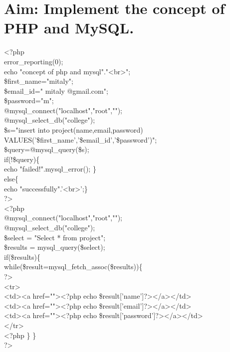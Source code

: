 \section*{\fontsize{16}{14}\selectfont Aim: Implement the concept of PHP and MySQL.}
<?php\\
error\_reporting(0);\\
echo "concept of php and mysql"."<br>";\\
\$first\_name="mitaly";\\
\$email\_id=" mitaly @gmail.com";\\
\$password="m";\\
@mysql\_connect("localhost","root","");\\
@mysql\_select\_db("college");\\
\$s="insert into project(name,email,password) VALUES('\$first\_name','\$email\_id','\$password')";\\
\$query=@mysql\_query(\$s);\\
if(!\$query)\{\\
 echo "failed!".mysql\_error(); \}\\
else\{\\
echo "successfully".'<br>';\}\\
?>\\
<?php\\
@mysql\_connect("localhost","root","");\\
@mysql\_select\_db("college");\\
\$select = "Select * from project";\\
\$results = mysql\_query(\$select);\\
if(\$results)\{\\
while(\$result=mysql\_fetch\_assoc(\$results))\{\\
?>\\
<tr>\\
<td><a href=""><?php echo \$result['name']?></a></td>\\
<td><a href=""><?php echo \$result['email']?></a></td>\\
<td><a href=""><?php echo \$result['password']?></a></td>\\
</tr>\\
<?php \} \} \\
?>


